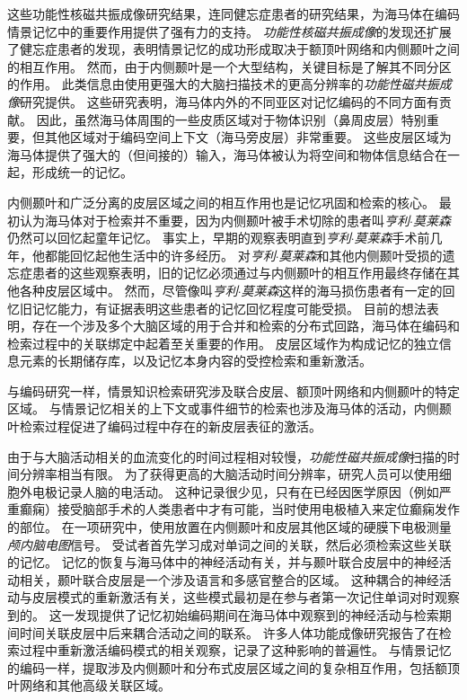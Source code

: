 这些功能性核磁共振成像研究结果，连同健忘症患者的研究结果，为海马体在编码情景记忆中的重要作用提供了强有力的支持。
\textit{功能性核磁共振成像}的发现还扩展了健忘症患者的发现，表明情景记忆的成功形成取决于额顶叶网络和内侧颞叶之间的相互作用。
然而，由于内侧颞叶是一个大型结构，关键目标是了解其不同分区的作用。
此类信息由使用更强大的大脑扫描技术的更高分辨率的\textit{功能性磁共振成像}研究提供。
这些研究表明，海马体内外的不同亚区对记忆编码的不同方面有贡献。
因此，虽然海马体周围的一些皮质区域对于物体识别（鼻周皮层）特别重要，但其他区域对于编码空间上下文（海马旁皮层）非常重要。
这些皮层区域为海马体提供了强大的（但间接的）输入，海马体被认为将空间和物体信息结合在一起，形成统一的记忆。


内侧颞叶和广泛分离的皮层区域之间的相互作用也是记忆巩固和检索的核心。
最初认为海马体对于检索并不重要，因为内侧颞叶被手术切除的患者叫\textit{亨利$\cdot$莫莱森}仍然可以回忆起童年记忆。
事实上，早期的观察表明直到\textit{亨利$\cdot$莫莱森}手术前几年，他都能回忆起他生活中的许多经历。
对\textit{亨利$\cdot$莫莱森}和其他内侧颞叶受损的遗忘症患者的这些观察表明，旧的记忆必须通过与内侧颞叶的相互作用最终存储在其他各种皮层区域中。
然而，尽管像叫\textit{亨利$\cdot$莫莱森}这样的海马损伤患者有一定的回忆旧记忆能力，有证据表明这些患者的记忆回忆程度可能受损。
目前的想法表明，存在一个涉及多个大脑区域的用于合并和检索的分布式回路，海马体在编码和检索过程中的关联绑定中起着至关重要的作用。
皮层区域作为构成记忆的独立信息元素的长期储存库，以及记忆本身内容的受控检索和重新激活。


与编码研究一样，情景知识检索研究涉及联合皮层、额顶叶网络和内侧颞叶的特定区域。
与情景记忆相关的上下文或事件细节的检索也涉及海马体的活动，内侧颞叶检索过程促进了编码过程中存在的新皮层表征的激活。


由于与大脑活动相关的血流变化的时间过程相对较慢，\textit{功能性磁共振成像}扫描的时间分辨率相当有限。
为了获得更高的大脑活动时间分辨率，研究人员可以使用细胞外电极记录人脑的电活动。
这种记录很少见，只有在已经因医学原因（例如严重癫痫）接受脑部手术的人类患者中才有可能，当时使用电极植入来定位癫痫发作的部位。
在一项研究中，使用放置在内侧颞叶和皮层其他区域的硬膜下电极测量\textit{颅内脑电图}信号。
受试者首先学习成对单词之间的关联，然后必须检索这些关联的记忆。
记忆的恢复与海马体中的神经活动有关，并与颞叶联合皮层中的神经活动相关，颞叶联合皮层是一个涉及语言和多感官整合的区域。
这种耦合的神经活动与皮层模式的重新激活有关，这些模式最初是在参与者第一次记住单词对时观察到的。
这一发现提供了记忆初始编码期间在海马体中观察到的神经活动与检索期间时间关联皮层中后来耦合活动之间的联系。
许多人体功能成像研究报告了在检索过程中重新激活编码模式的相关观察，记录了这种影响的普遍性。
与情景记忆的编码一样，提取涉及内侧颞叶和分布式皮层区域之间的复杂相互作用，包括额顶叶网络和其他高级关联区域。



